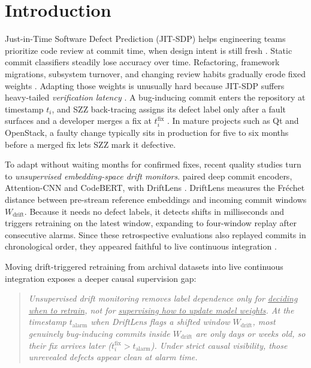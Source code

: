 \documentclass[pdflatex,sn-basic]{sn-jnl}
\theoremstyle{definition}
\theoremstyle{plain}
\begin{document}
\section{Introduction}
\label{sec:intro}

Just-in-Time Software Defect Prediction (JIT-SDP) helps engineering teams prioritize code review at commit time, when design intent is still fresh \citep{kamei2013large,hoang2019deepjit,pornprasit2021jitline,marrium2026flame}. Static commit classifiers steadily lose accuracy over time. Refactoring, framework migrations, subsystem turnover, and changing review habits gradually erode fixed weights \citep{mcintosh2018are,gama2014survey,lu2018learning}. Adapting those weights is unusually hard because JIT-SDP suffers heavy-tailed \textit{verification latency} \citep{cabral2019class,tabassam2020handling,song2022odasc,song2023humla}. A bug-inducing commit enters the repository at timestamp $t_i$, and SZZ back-tracing assigns its defect label only after a fault surfaces and a developer merges a fix at $t_i^{\text{fix}}$ \citep{sliwerski2005when,dacosta2017framework,rosa2021evaluating,fan2021impact,bludau2026quantifying}. In mature projects such as Qt and OpenStack, a faulty change typically sits in production for five to six months before a merged fix lets SZZ mark it defective.

To adapt without waiting months for confirmed fixes, recent quality studies turn to \textit{unsupervised embedding-space drift monitors}. \citet{pote2026adaptive} paired deep commit encoders, Attention-CNN and CodeBERT, with DriftLens \citep{greco2021driftlens,greco2023driftlens}. DriftLens measures the Fr\'echet distance \citep{dowson1982frechet} between pre-stream reference embeddings and incoming commit windows $W_{\text{drift}}$. Because it needs no defect labels, it detects shifts in milliseconds and triggers retraining on the latest window, expanding to four-window replay after consecutive alarms. Since these retrospective evaluations also replayed commits in chronological order, they appeared faithful to live continuous integration \citep{pote2026adaptive}.

Moving drift-triggered retraining from archival datasets into live continuous integration exposes a deeper causal supervision gap:

\begin{quote}
\small\textit{Unsupervised drift monitoring removes label dependence only for \underline{deciding when to retrain}, not for \underline{supervising how to update model weights}. At the timestamp $t_{\text{alarm}}$ when DriftLens flags a shifted window $W_{\text{drift}}$, most genuinely bug-inducing commits inside $W_{\text{drift}}$ are only days or weeks old, so their fix arrives later ($t_i^{\text{fix}} > t_{\text{alarm}}$). Under strict causal visibility, those unrevealed defects appear clean at alarm time.}
\end{quote}
\end{document}
